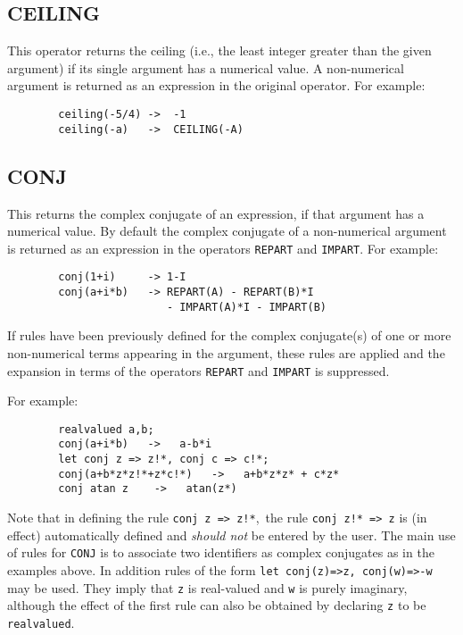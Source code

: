 \subsection{CEILING}
\hypertarget{operator:CEILING}{}
This operator returns the ceiling (i.e., the least integer greater than
the given argument) if its single argument has a numerical value.  A
non-numerical argument is returned as an expression in the original
operator.  For example:

\begin{verbatim}
        ceiling(-5/4) ->  -1
        ceiling(-a)   ->  CEILING(-A)
\end{verbatim}

\subsection{CONJ}
\hypertarget{operator:CONJ}{}
This returns the complex conjugate
of an expression, if that argument has a numerical value.  By default the
complex conjugate of a non-numerical argument is returned as an expression
in the operators
\texttt{REPART} and \texttt{IMPART}.
For example:
\begin{verbatim}
        conj(1+i)     -> 1-I
        conj(a+i*b)   -> REPART(A) - REPART(B)*I
                         - IMPART(A)*I - IMPART(B)
\end{verbatim}

If rules have been previously defined for the complex conjugate(s)
of one or more non-numerical terms appearing in the argument, these rules are
applied and the expansion in terms of the operators
\texttt{REPART} and \texttt{IMPART} is
suppressed.

For example:
\begin{verbatim}
        realvalued a,b;
        conj(a+i*b)   ->   a-b*i
        let conj z => z!*, conj c => c!*;
        conj(a+b*z*z!*+z*c!*)   ->   a+b*z*z* + c*z*
        conj atan z    ->   atan(z*)
\end{verbatim}

Note that in defining the rule \texttt{conj z => z!*},\ the rule
\texttt{conj z!*  => z} is (in effect) automatically defined and
\emph{should not} be entered by the user.
The main use of rules for \texttt{CONJ} is to associate two identifiers
as complex conjugates as in the examples above. In addition rules of the form
\texttt{let conj(z)=>z, conj(w)=>-w} may be used. They imply that
\texttt{z} is real-valued and \texttt{w} is purely imaginary, although
the effect of the first rule can also be obtained by declaring \texttt{z}
to be \texttt{realvalued}.

